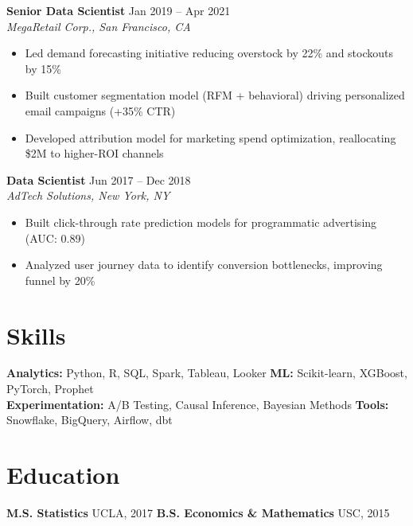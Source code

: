 \documentclass[11pt,a4paper]{article}
\begin{document}
\noindent\textbf{Senior Data Scientist} \hfill Jan 2019 -- Apr 2021\\
\textit{MegaRetail Corp., San Francisco, CA}
\begin{itemize}[leftmargin=1.2em,nosep,label={\color{accent}\textbullet}]
\item Led demand forecasting initiative reducing overstock by 22\% and stockouts by 15\%
\item Built customer segmentation model (RFM + behavioral) driving personalized email campaigns (+35\% CTR)
\item Developed attribution model for marketing spend optimization, reallocating \$2M to higher-ROI channels
\end{itemize}
\vspace{0.5em}

\noindent\textbf{Data Scientist} \hfill Jun 2017 -- Dec 2018\\
\textit{AdTech Solutions, New York, NY}
\begin{itemize}[leftmargin=1.2em,nosep,label={\color{accent}\textbullet}]
\item Built click-through rate prediction models for programmatic advertising (AUC: 0.89)
\item Analyzed user journey data to identify conversion bottlenecks, improving funnel by 20\%
\end{itemize}

\section{Skills}
\noindent\textbf{Analytics:} Python, R, SQL, Spark, Tableau, Looker \quad\textbf{ML:} Scikit-learn, XGBoost, PyTorch, Prophet\\
\textbf{Experimentation:} A/B Testing, Causal Inference, Bayesian Methods \quad\textbf{Tools:} Snowflake, BigQuery, Airflow, dbt

\section{Education}
\noindent\textbf{M.S. Statistics} \hfill UCLA, 2017 \qquad \textbf{B.S. Economics \& Mathematics} \hfill USC, 2015
\end{document}
